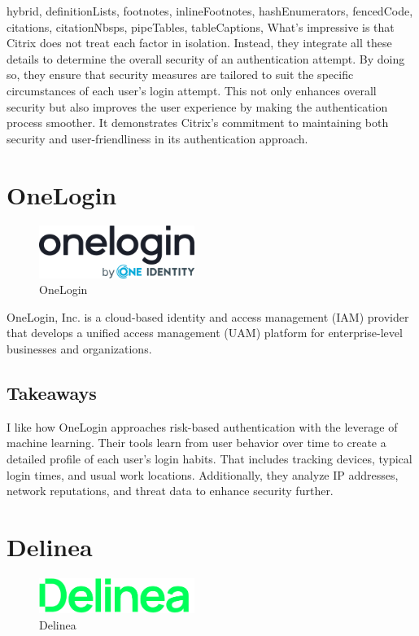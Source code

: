 \documentclass[
  digital,     %
  oneside,     %
  nosansbold,  %
  nocolorbold, %
  lof,         %
  lot,         %
]{fithesis4}
\begin{document}
\begin{markdown*}{%
  hybrid,
  definitionLists,
  footnotes,
  inlineFootnotes,
  hashEnumerators,
  fencedCode,
  citations,
  citationNbsps,
  pipeTables,
  tableCaptions,
}
What's impressive is that Citrix does not treat each factor in isolation.
Instead, they integrate all these details to determine the overall security of an authentication attempt.
By doing so, they ensure that security measures are tailored to suit the specific circumstances of each user's login attempt. This not only enhances overall security but also improves the user experience by making the authentication process smoother.
It demonstrates Citrix's commitment to maintaining both security and user-friendliness in its authentication approach.\cite{existing-citrix-wiki} \cite{existing-citrix-blog}


\newpage
\section{OneLogin}

\begin{figure}[htbp]
  \centering
  \includegraphics[width=0.45\textwidth]{img/onelogin.png}
  \caption{OneLogin}
  \label{fig:onelogin-logo}
\end{figure}

OneLogin, Inc. is a cloud-based identity and access management (IAM) provider that develops a unified access management (UAM) platform for enterprise-level businesses and organizations. \cite{existing-onelogin}

\subsection{Takeaways}
I like how OneLogin approaches risk-based authentication with the leverage of machine learning. 
Their tools learn from user behavior over time to create a detailed profile of each user's login habits.
That includes tracking devices, typical login times, and usual work locations.
Additionally, they analyze IP addresses, network reputations, and threat data to enhance security further.

\newpage
\section{Delinea}

\begin{figure}[htbp]
  \centering
  \includegraphics[width=0.45\textwidth]{img/delinea.png}
  \caption{Delinea}
  \label{fig:delinea-logo}
\end{figure}


\end{markdown*}
\end{document}
